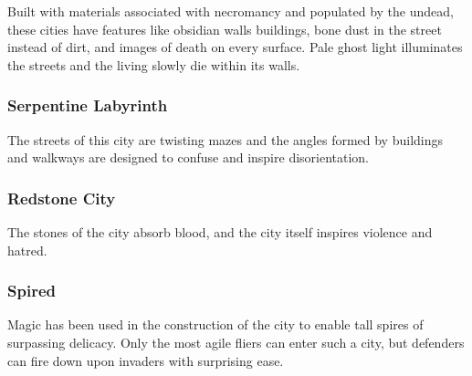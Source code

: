 Built with materials associated with necromancy and populated by the undead, these cities have features like obsidian walls buildings, bone dust in the street instead of dirt, and images of death on every surface. Pale ghost light illuminates the streets and the living slowly die within its walls.



\subsubsection{Serpentine Labyrinth}

The streets of this city are twisting mazes and the angles formed by buildings and walkways are designed to confuse and inspire disorientation.



\subsubsection{Redstone City}

The stones of the city absorb blood, and the city itself inspires violence and hatred.



\subsubsection{Spired}

Magic has been used in the construction of the city to enable tall spires of surpassing delicacy. Only the most agile fliers can enter such a city, but defenders can fire down upon invaders with surprising ease.


